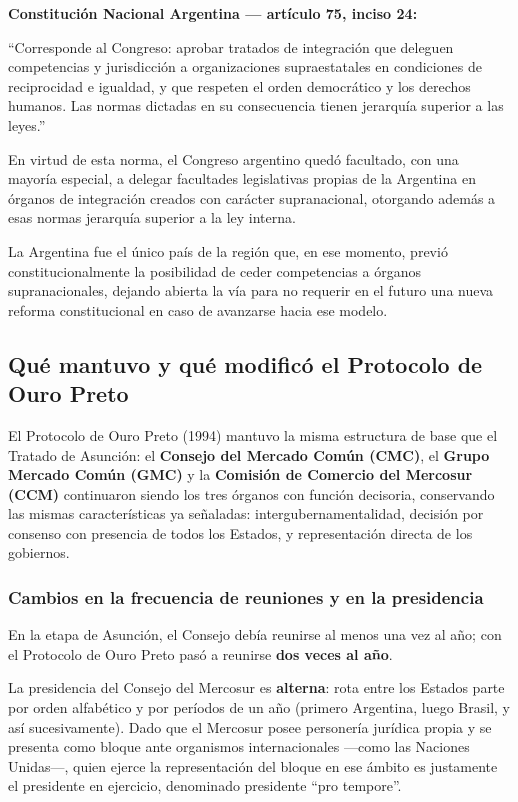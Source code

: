\documentclass[12pt,oneside]{book}
\begin{document}
\begin{important}
\textbf{Constitución Nacional Argentina — artículo 75, inciso 24:}

``Corresponde al Congreso: aprobar tratados de integración que deleguen competencias y jurisdicción a organizaciones supraestatales en condiciones de reciprocidad e igualdad, y que respeten el orden democrático y los derechos humanos. Las normas dictadas en su consecuencia tienen jerarquía superior a las leyes.''
\end{important}

En virtud de esta norma, el Congreso argentino quedó facultado, con una mayoría especial, a delegar facultades legislativas propias de la Argentina en órganos de integración creados con carácter supranacional, otorgando además a esas normas jerarquía superior a la ley interna.

La Argentina fue el único país de la región que, en ese momento, previó constitucionalmente la posibilidad de ceder competencias a órganos supranacionales, dejando abierta la vía para no requerir en el futuro una nueva reforma constitucional en caso de avanzarse hacia ese modelo.

\subsection{Qué mantuvo y qué modificó el Protocolo de Ouro Preto}

El Protocolo de Ouro Preto (1994) mantuvo la misma estructura de base que el Tratado de Asunción: el \textbf{Consejo del Mercado Común (CMC)}, el \textbf{Grupo Mercado Común (GMC)} y la \textbf{Comisión de Comercio del Mercosur (CCM)} continuaron siendo los tres órganos con función decisoria, conservando las mismas características ya señaladas: intergubernamentalidad, decisión por consenso con presencia de todos los Estados, y representación directa de los gobiernos.

\subsubsection{Cambios en la frecuencia de reuniones y en la presidencia}

En la etapa de Asunción, el Consejo debía reunirse al menos una vez al año; con el Protocolo de Ouro Preto pasó a reunirse \textbf{dos veces al año}.

La presidencia del Consejo del Mercosur es \textbf{alterna}: rota entre los Estados parte por orden alfabético y por períodos de un año (primero Argentina, luego Brasil, y así sucesivamente). Dado que el Mercosur posee personería jurídica propia y se presenta como bloque ante organismos internacionales —como las Naciones Unidas—, quien ejerce la representación del bloque en ese ámbito es justamente el presidente en ejercicio, denominado presidente ``pro tempore''.
\end{document}

